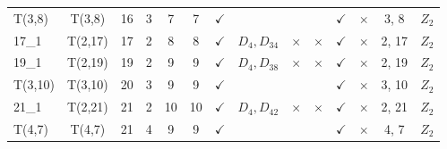 \documentclass[a4paper,11pt]{article}
\begin{document}
\begin{longtable}{lccccccccccccc}
T(3,8) & T(3,8) & 16 & 3 & 7 & 7 & $\checkmark$ &  &  &  & $\checkmark$ & $\times$ & 3, 8 & $Z_2$ \\
17\_1 & T(2,17) & 17 & 2 & 8 & 8 & $\checkmark$ & $D_4, D_{34}$ & $\times$ & $\times$ & $\checkmark$ & $\times$ & 2, 17 & $Z_2$ \\
19\_1 & T(2,19) & 19 & 2 & 9 & 9 & $\checkmark$ & $D_4, D_{38}$ & $\times$ & $\times$ & $\checkmark$ & $\times$ & 2, 19 & $Z_2$ \\
T(3,10) & T(3,10) & 20 & 3 & 9 & 9 & $\checkmark$ &  &  &  & $\checkmark$ & $\times$ & 3, 10 & $Z_2$ \\
21\_1 & T(2,21) & 21 & 2 & 10 & 10 & $\checkmark$ & $D_4, D_{42}$ & $\times$ & $\times$ & $\checkmark$ & $\times$ & 2, 21 & $Z_2$ \\
T(4,7) & T(4,7) & 21 & 4 & 9 & 9 & $\checkmark$ &  &  &  & $\checkmark$ & $\times$ & 4, 7 & $Z_2$ \\
\bottomrule
\end{longtable}
\end{document}
